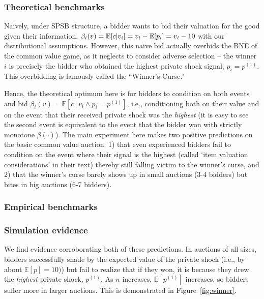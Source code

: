 \documentclass{article} %
\begin{document}
\subsubsection{Theoretical benchmarks}
Naively, under SPSB structure, a bidder wants to bid their valuation for the good given their information, $\beta_i(v) = \mathbb{E}[c | v_i] = v_i - \mathbb{E}[p_i] = v_i - 10$ with our distributional assumptions. 
However, this naive bid actually overbids the BNE of the common value game, as it neglects to consider adverse selection -- the winner $i$ is precisely the bidder who obtained the highest private shock signal, $p_i = p^(1)$. 
This overbidding is famously called the ``Winner's Curse." 

Hence, the theoretical optimum here is for bidders to condition on both events and bid $\beta_i(v) = \mathbb{E}[c \, | \, v_i \wedge p_i = p^{(1)}]$, i.e., conditioning both on their value and on the event that their received private shock was the \textit{highest} (it is easy to see the second event is equivalent to the event that the bidder won with strictly monotone $\beta(\cdot)$). 
The main experiment here \cite{kagel1986winner} makes two positive predictions on the basic common value auction: 1) that even experienced bidders fail to condition on the event where their signal is the highest (called `item valuation considerations' in their text) thereby still falling victim to the winner's curse, and 2) that the winner's curse barely shows up in small auctions (3-4 bidders) but bites in big auctions (6-7 bidders).

\subsubsection{Empirical benchmarks}

\subsubsection{Simulation evidence}
We find evidence corroborating both of these predictions. 
In auctions of all sizes, bidders successfully shade by the expected value of the private shock (i.e., by about $\mathbb{E}[p] = 10)$) but fail to realize that if they won, it is because they drew the \textit{highest} private shock, $p^{(1)}$. 
As $n$ increases, $\mathbb{E}[p^{(1)}]$ increases, so bidders suffer more in larger auctions. 
This is demonstrated in Figure~\ref{fig:winner}. 
\end{document}
